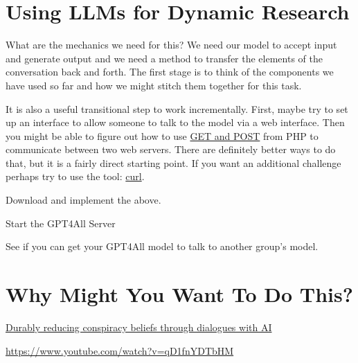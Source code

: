 \documentclass[
  letterpaper,
  DIV=11,
  numbers=noendperiod]{scrreprt}
\begin{document}
\section{Using LLMs for Dynamic
Research}\label{using-llms-for-dynamic-research}

What are the mechanics we need for this? We need our model to accept
input and generate output and we need a method to transfer the elements
of the conversation back and forth. The first stage is to think of the
components we have used so far and how we might stitch them together for
this task.

It is also a useful transitional step to work incrementally. First,
maybe try to set up an interface to allow someone to talk to the model
via a web interface. Then you might be able to figure out how to use
\href{link}{GET and POST} from PHP to communicate between two web
servers. There are definitely better ways to do that, but it is a fairly
direct starting point. If you want an additional challenge perhaps try
to use the tool:
\href{https://medium.com/@kevinkoech265/curl-a-deep-dive-into-command-line-data-transfer-8361a85b177d}{curl}.

\begin{tcolorbox}[enhanced jigsaw, opacityback=0, leftrule=.75mm, colback=white, left=2mm, titlerule=0mm, toprule=.15mm, toptitle=1mm, coltitle=black, title=\textcolor{quarto-callout-tip-color}{\faLightbulb}\hspace{0.5em}{Classroom Exercise}, opacitybacktitle=0.6, colbacktitle=quarto-callout-tip-color!10!white, breakable, bottomrule=.15mm, bottomtitle=1mm, colframe=quarto-callout-tip-color-frame, arc=.35mm, rightrule=.15mm]

Download and implement the above.

Start the GPT4All Server

See if you can get your GPT4All model to talk to another group's model.

\end{tcolorbox}

\section{Why Might You Want To Do
This?}\label{why-might-you-want-to-do-this}

\href{https://www.science.org/doi/10.1126/science.adq1814}{Durably
reducing conspiracy beliefs through dialogues with AI}

\url{https://www.youtube.com/watch?v=qD1fnYDTbHM}
\end{document}
